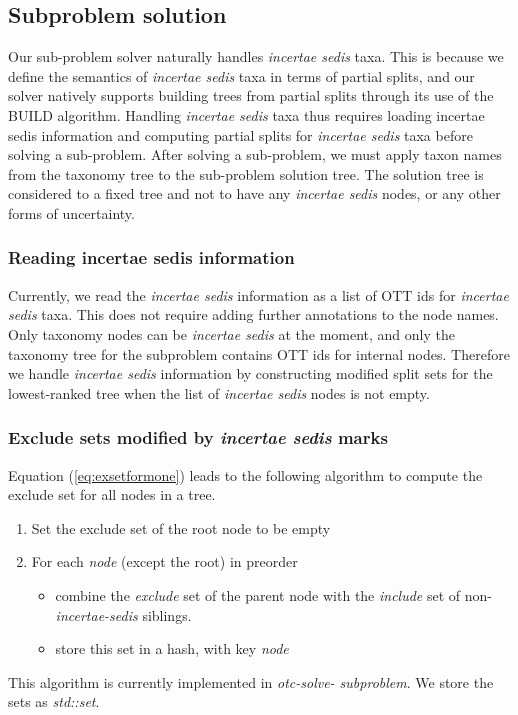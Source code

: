 \documentclass[english]{article}
\begin{document}
\subsection{Subproblem solution}

Our sub-problem solver naturally handles \emph{incertae sedis} taxa.
This is because we define the semantics of \emph{incertae sedis} taxa
in terms of partial splits, and our solver natively supports building
trees from partial splits through its use of the BUILD algorithm.
Handling \emph{incertae sedis} taxa thus requires loading incertae
sedis information and computing partial splits for \emph{incertae
sedis} taxa before solving a sub-problem.
After solving a sub-problem,
we must apply taxon names from the taxonomy tree to the sub-problem
solution tree.
The solution tree is considered to a fixed tree and not
to have any \emph{incertae sedis} nodes, or any other forms of
uncertainty.

\subsubsection{Reading incertae sedis information}

Currently, we read the \emph{incertae sedis} information as a list of
OTT ids for \emph{incertae sedis} taxa.
This does not require adding
further annotations to the node names.
Only taxonomy nodes can be
\emph{incertae sedis} at the moment, and only the taxonomy tree for
the subproblem contains OTT ids for internal nodes.
Therefore we
handle \emph{incertae sedis} information by constructing modified
split sets for the lowest-ranked tree when the list of \emph{incertae
sedis} nodes is not empty.

\subsubsection{Exclude sets modified by \emph{incertae sedis} marks}

Equation (\ref{eq:exsetformone}) leads to the following
algorithm to compute the exclude set for all nodes in a tree.
\begin{enumerate} \item Set the exclude set of the root node to be
empty \item For each \emph{node} (except the root) in preorder
\begin{itemize} \item combine the \emph{exclude} set of the parent
node with the \emph{include} set of non-\emph{incertae-sedis}
siblings.
\item store this set in a hash, with key \emph{node}
\end{itemize} \end{enumerate} This algorithm is currently implemented
in \emph{otc-solve- subproblem}.
We store the sets as \emph{std::set}.
\end{document}
